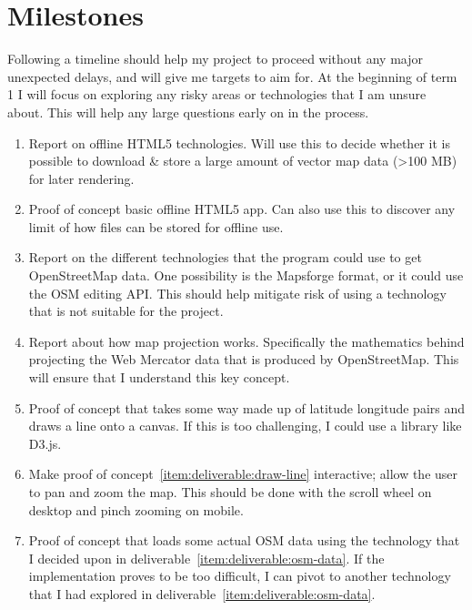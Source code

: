 \documentclass[]{final_report}
\begin{document}
\section{Milestones}


Following a timeline should help my project to proceed without any major unexpected delays, and will give me targets to aim for. At the beginning of term 1 I will focus on exploring any risky areas or technologies that I am unsure about. This will help any large questions early on in the process.

\begin{enumerate}
    \item Report on offline HTML5 technologies. Will use this to decide whether it is possible to download \& store a large amount of vector map data (>100 MB) for later rendering.\label{item:deliverable:offline-html}
    \item Proof of concept basic offline HTML5 app. Can also use this to discover any limit of how files can be stored for offline use.\label{item:deliverable:basic-offline-app}
    \item Report on the different technologies that the program could use to get OpenStreetMap data. One possibility is the Mapsforge format, or it could use the OSM editing API\@. This should help mitigate risk of using a technology that is not suitable for the project.\label{item:deliverable:osm-data}
    \item Report about how map projection works. Specifically the mathematics behind projecting the Web Mercator data that is produced by OpenStreetMap. This will ensure that I understand this key concept.\label{item:deliverable:map-projection}
    \item Proof of concept that takes some way made up of latitude longitude pairs and draws a line onto a canvas. If this is too challenging, I could use a library like D3.js.\label{item:deliverable:draw-line}
    \item Make proof of concept~\ref{item:deliverable:draw-line} interactive; allow the user to pan and zoom the map. This should be done with the scroll wheel on desktop and pinch zooming on mobile.\label{item:deliverable:pan-zoom}
    \item Proof of concept that loads some actual OSM data using the technology that I decided upon in deliverable~\ref{item:deliverable:osm-data}. If the implementation proves to be too difficult, I can pivot to another technology that I had explored in deliverable~\ref{item:deliverable:osm-data}.\label{item:deliverable:load-osm-data}

\end{enumerate}
\end{document}
